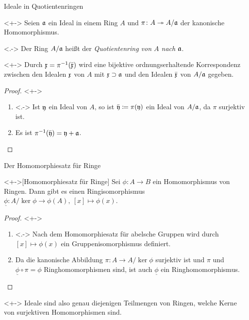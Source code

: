 \begin{frame}{Ideale in Quotientenringen}
    \begin{visibleenv}<+->
        Seien \(\mathfrak{a}\) ein Ideal in einem Ring \(A\) und
        \(\pi\colon A \twoheadrightarrow A/\mathfrak{a}\) der kanonische Homomorphismus.
    \end{visibleenv}
    \begin{definition}<.->
        Der Ring \(A/\mathfrak{a}\) heißt der \emph{Quotientenring von \(A\) nach
        \(\mathfrak{a}\)}.
    \end{definition}
    \begin{proposition}<+->
        Durch \(\mathfrak{x} = \pi^{-1}(\bar{\mathfrak{x}})\) wird eine bijektive
        ordnungserhaltende Korrespondenz zwischen den
        Idealen \(\mathfrak{x}\) von \(A\) mit \(\mathfrak{x} \supset \mathfrak{a}\) und den
        Idealen \(\bar{\mathfrak{x}}\) von \(A/\mathfrak{a}\) gegeben.
    \end{proposition}
    \begin{proof}<+->
        \begin{enumerate}[<+->]
        \item<.->
            Ist \(\mathfrak{y}\) ein Ideal von \(A\), so ist
            \(\bar{\mathfrak{y}} \coloneqq \pi(\mathfrak{y})\) ein Ideal von
            \(A/\mathfrak{a}\), da \(\pi\) surjektiv ist.
        \item
            Es ist \(\pi^{-1}(\bar {\mathfrak{y}}) = \mathfrak{y} + \mathfrak{a}\).
        \qedhere
        \end{enumerate}
    \end{proof}
\end{frame}

\begin{frame}{Der Homomorphiesatz für Ringe}
    \begin{proposition}<+->[Homomorphiesatz für Ringe]
        Sei \(\phi\colon A \to B\) ein Homomorphismus von Ringen. Dann gibt es
        einen Ringisomorphismus
        \(\underline\phi\colon A/\ker \phi \to \phi(A),\ [x] \mapsto \phi(x)\).
    \end{proposition}
    \begin{proof}<+->
        \begin{enumerate}
        \item<.->
            Nach dem Homomorphiesatz für abelsche Gruppen wird
            durch \([x] \mapsto \phi(x)\) ein Gruppenisomorphismus definiert.
        \item
            Da die kanonische Abbildung \(\pi\colon A \to A/\ker \phi\) surjektiv ist
            und \(\pi\) und \(\underline\phi \circ \pi = \phi\) Ringhomomorphismen sind,
            ist auch \(\underline\phi\) ein Ringhomomorphismus.
            \qedhere
        \end{enumerate}
    \end{proof}
    \begin{remark}<+->
        Ideale sind also genau diejenigen Teilmengen von Ringen, welche
        Kerne von surjektiven Homomorphismen sind.
    \end{remark}
\end{frame}


